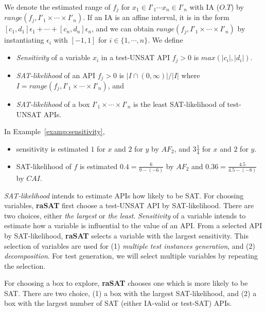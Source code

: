 \documentclass[runningheads,a4paper,oribibl]{llncs}
\begin{document}
We denote the estimated range of $f_j$ for $x_1 \in I'_1 \cdots x_n \in I'_n$ with IA ($O.T$)
by $range(f_j, I'_1 \times \cdots \times I'_n)$. 
If an IA is an affine interval, 
it is in the form $[c_1,d_1]\epsilon_1 + \cdots + [c_n,d_n]\epsilon_n$, 
and we can obtain $range(f_j, I'_1 \times \cdots \times I'_n)$ by instantiating $\epsilon_i$ with $[-1,1]$ for $i \in \{1, \cdots, n\}$. 
We define 
\begin{itemize} 

\item {\em Sensitivity} of a variable $x_i$ in a test-UNSAT API $f_j > 0$ is $max(|c_i|, |d_i|)$. 
\item {\em SAT-likelihood} of an API $f_j > 0$ is $| I \cap (0,\infty) | / |I|$ where $I = range(f_j, I'_1 \times \cdots \times I'_n)$, and 
\item {\em SAT-likelihood} of a box $I'_1 \times \cdots \times I'_n$ is 
the least SAT-likelihood of test-UNSAT APIs. 
\end{itemize} 

\begin{example} \label{examp:SATlikelihood}
In Example~\ref{examp:sensitivity}, 
\begin{itemize}
\item sensitivity is estimated $1$ for $x$ and $2$ for $y$ by $AF_2$, and $3\frac{1}{4}$ for $x$ and 
$2$ for $y$. 
\item SAT-likelihood of $f$ is estimated $0.4= \frac{6}{9-(-6)}$ by $AF_2$ 
and $0.36 = \frac{4.5}{4.5-(-8)}$ by $CAI$. 
\end{itemize}
\end{example}


{\em SAT-likelihood} intends to estimate APIs how likely to be SAT. 
For choosing variables, {\bf raSAT} first choose a test-UNSAT API by SAT-likelihood. 
There are two choices, either {\em the largest} or {\em the least}. 
{\em Sensitivity} of a variable intends to estimate how a variable is influential to the value of an API. 
From a selected API by SAT-likelihood, {\bf raSAT} selects a variable with the largest sensitivity. 
This selection of variables are used for (1) {\em multiple test instances generation}, and 
(2) {\em decomposition}. 
For test generation, we will select multiple variables by repeating the selection. 

For choosing a box to explore, {\bf raSAT} chooses one which is more likely to be SAT. 
There are two choice, (1) a box with the largest SAT-likelihood, and 
(2) a box with the largest number of SAT (either IA-valid or test-SAT) APIs. 
\end{document}
